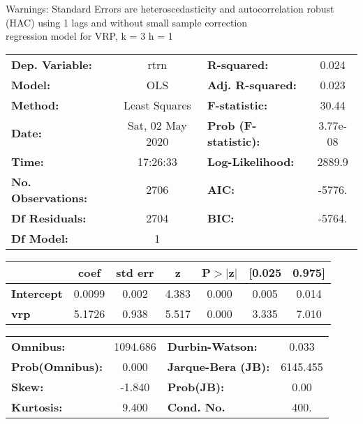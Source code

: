 Warnings: \newline
 [1] Standard Errors are heteroscedasticity and autocorrelation robust (HAC) using 1 lags and without small sample correction\\ 

regression model for VRP, k = 3 h = 1\begin{center}
\begin{tabular}{lclc}
\toprule
\textbf{Dep. Variable:}    &       rtrn       & \textbf{  R-squared:         } &     0.024   \\
\textbf{Model:}            &       OLS        & \textbf{  Adj. R-squared:    } &     0.023   \\
\textbf{Method:}           &  Least Squares   & \textbf{  F-statistic:       } &     30.44   \\
\textbf{Date:}             & Sat, 02 May 2020 & \textbf{  Prob (F-statistic):} &  3.77e-08   \\
\textbf{Time:}             &     17:26:33     & \textbf{  Log-Likelihood:    } &    2889.9   \\
\textbf{No. Observations:} &        2706      & \textbf{  AIC:               } &    -5776.   \\
\textbf{Df Residuals:}     &        2704      & \textbf{  BIC:               } &    -5764.   \\
\textbf{Df Model:}         &           1      & \textbf{                     } &             \\
\bottomrule
\end{tabular}
\begin{tabular}{lcccccc}
                   & \textbf{coef} & \textbf{std err} & \textbf{z} & \textbf{P$> |$z$|$} & \textbf{[0.025} & \textbf{0.975]}  \\
\midrule
\textbf{Intercept} &       0.0099  &        0.002     &     4.383  &         0.000        &        0.005    &        0.014     \\
\textbf{vrp}       &       5.1726  &        0.938     &     5.517  &         0.000        &        3.335    &        7.010     \\
\bottomrule
\end{tabular}
\begin{tabular}{lclc}
\textbf{Omnibus:}       & 1094.686 & \textbf{  Durbin-Watson:     } &    0.033  \\
\textbf{Prob(Omnibus):} &   0.000  & \textbf{  Jarque-Bera (JB):  } & 6145.455  \\
\textbf{Skew:}          &  -1.840  & \textbf{  Prob(JB):          } &     0.00  \\
\textbf{Kurtosis:}      &   9.400  & \textbf{  Cond. No.          } &     400.  \\
\bottomrule
\end{tabular}
\end{center}

